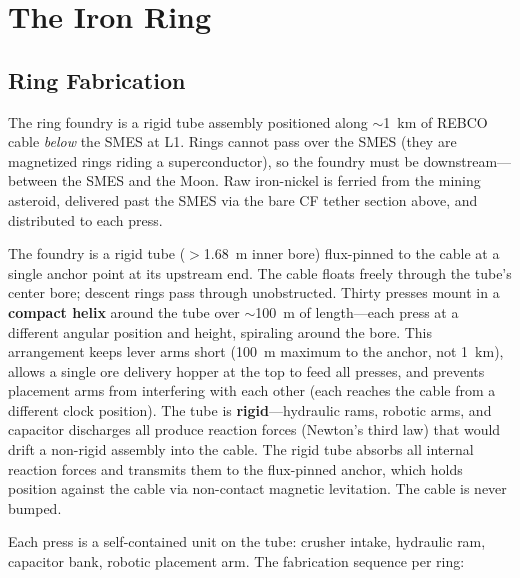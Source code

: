 \documentclass[12pt,letterpaper]{article}
\begin{document}
\section{The Iron Ring}

\subsection{Ring Fabrication}

The ring foundry is a rigid tube assembly positioned along ${\sim}$1~km of REBCO cable \emph{below} the SMES at L1. Rings cannot pass over the SMES (they are magnetized rings riding a superconductor), so the foundry must be downstream---between the SMES and the Moon. Raw iron-nickel is ferried from the mining asteroid, delivered past the SMES via the bare CF tether section above, and distributed to each press.

The foundry is a rigid tube ($>$1.68~m inner bore) flux-pinned to the cable at a single anchor point at its upstream end. The cable floats freely through the tube's center bore; descent rings pass through unobstructed. Thirty presses mount in a \textbf{compact helix} around the tube over ${\sim}$100~m of length---each press at a different angular position and height, spiraling around the bore. This arrangement keeps lever arms short (100~m maximum to the anchor, not 1~km), allows a single ore delivery hopper at the top to feed all presses, and prevents placement arms from interfering with each other (each reaches the cable from a different clock position). The tube is \textbf{rigid}---hydraulic rams, robotic arms, and capacitor discharges all produce reaction forces (Newton's third law) that would drift a non-rigid assembly into the cable. The rigid tube absorbs all internal reaction forces and transmits them to the flux-pinned anchor, which holds position against the cable via non-contact magnetic levitation. The cable is never bumped.

Each press is a self-contained unit on the tube: crusher intake, hydraulic ram, capacitor bank, robotic placement arm. The fabrication sequence per ring:
\end{document}
